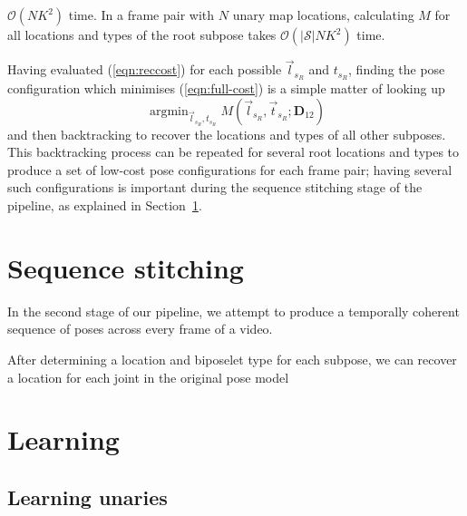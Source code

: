 \documentclass[runningheads]{llncs}
\newcommand{\mat}{\mathbf}
\DeclareMathOperator{\argmin}{arg min}
\begin{document}
$\mathcal O(N K^2)$ time.
In a frame pair with $N$ unary map locations, calculating $M$ for all locations
and types of the root subpose takes $\mathcal O(|\mathcal S| N K^2)$ time.

Having evaluated (\ref{eqn:reccost}) for each possible $\vec l_{s_R}$ and
$t_{s_R}$, finding the pose configuration which minimises (\ref{eqn:full-cost})
is a simple matter of looking up
%
\begin{equation}
\argmin_{\vec l_{s_R}, t_{s_R}} M(\vec l_{s_R}, \vec t_{s_R}; \mat D_{12})
\end{equation}
%
and then backtracking to recover the locations
and types of all other subposes. This backtracking process can be repeated for
several root locations and types to produce a set of low-cost pose
configurations for each frame pair; having several such configurations is
important during the sequence stitching stage of the pipeline, as explained in
Section~\ref{sec:stitching}.

\section{Sequence stitching}\label{sec:stitching}

%

In the second stage of our pipeline, we attempt to produce a temporally coherent
sequence of poses across every frame of a video.%

After determining a location and biposelet type for each subpose, we can recover
a location for each joint in the original pose model%

\section{Learning}


\subsection{Learning unaries}

\end{document}

